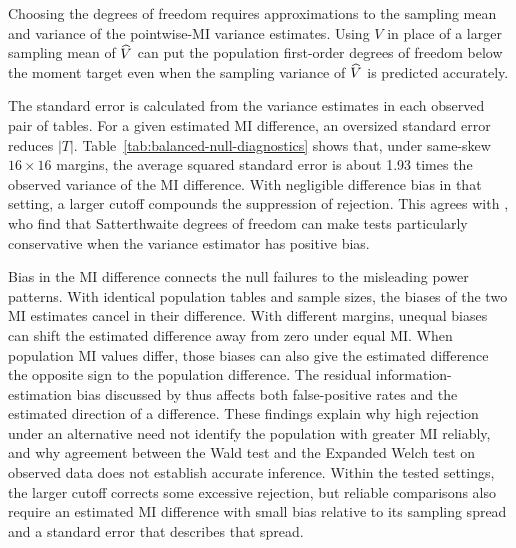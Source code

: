 Choosing the degrees of freedom requires approximations to the sampling
mean and variance of the pointwise-MI variance estimates. Using \(V\) in
place of a larger sampling mean of \(\widehat V\) can put the population first-order degrees of
freedom below the moment target even when the sampling variance of
\(\widehat V\) is predicted accurately.

The standard error is calculated from the variance estimates in each
observed pair of tables. For a given estimated MI difference, an
oversized standard error reduces \(|T|\).
Table~\ref{tab:balanced-null-diagnostics} shows that, under same-skew
\(16\times16\) margins, the average squared standard error is about
1.93 times the observed variance of the MI difference. With negligible
difference bias in that setting, a larger cutoff compounds the suppression
of rejection. This agrees with \citet{bell2002}, who find that
Satterthwaite degrees of freedom can make tests particularly conservative
when the variance estimator has positive bias.

Bias in the MI difference connects the null failures to the misleading
power patterns. With identical population tables and sample sizes, the biases of the two
MI estimates cancel in their difference. With different margins, unequal
biases can shift the estimated difference away from zero under equal MI.
When population MI values differ, those biases can also give the estimated
difference the opposite sign to the population difference. The residual information-estimation bias discussed
by \citet{paninski2003} thus affects both false-positive rates and the
estimated direction of a difference. These findings explain why high
rejection under an alternative need not identify the population with greater MI reliably,
and why agreement between the Wald test and the Expanded Welch test on observed data does
not establish accurate inference. Within the tested settings, the larger
cutoff corrects some excessive rejection, but reliable comparisons also
require an estimated MI difference with small bias relative to its
sampling spread and a standard error that describes that spread.
